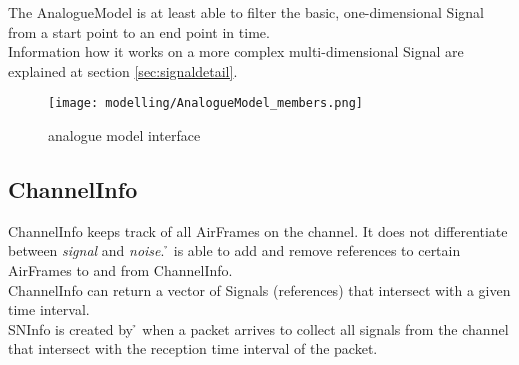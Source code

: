 %

The AnalogueModel is at least able to filter the basic, one-dimensional Signal from a start point to an end point in time.\\

Information how it works on a more complex multi-dimensional Signal are explained at section \ref{sec:signaldetail}.
 
\begin{figure}[H]
 \centering
 \texttt{[image: modelling/AnalogueModel\_members.png]}
 \caption{analogue model interface}
 \label{fig: analogue model interface}
\end{figure}
%





\subsection{ChannelInfo}

ChannelInfo keeps track of all AirFrames on the channel. It does not differentiate between \textit{signal} and \textit{noise}. \h{\bp} is able to
add and remove references to certain AirFrames to and from ChannelInfo.\\
ChannelInfo can return a vector of Signals (references) that intersect with a given time interval.\\
SNInfo is created by \h{\bp} when a packet arrives to collect all signals from the channel that intersect with the reception time interval of the packet.

